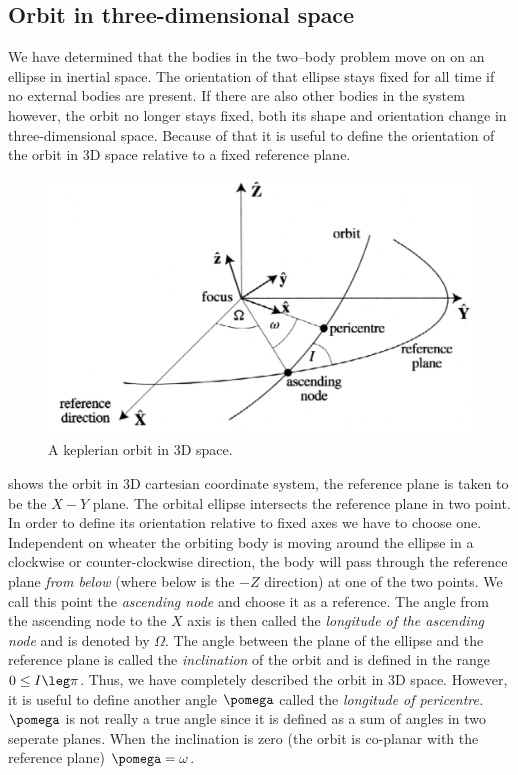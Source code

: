 \subsection{Orbit in three-dimensional space}
We have determined that the bodies in the two--body problem move on
on an ellipse in inertial space. The orientation of that ellipse 
stays fixed for all time if no external bodies are present. If there 
are also other bodies in the system however, the orbit no longer stays
fixed, both its shape and orientation change in three-dimensional space.
Because of that it is useful to define the orientation of the orbit
in 3D space relative to a fixed reference plane.
\begin{figure}[htb]
\centering
\includegraphics[width=0.8\linewidth]{gfx/3d_orbit.png}
\caption{A keplerian orbit in 3D space.}
\label{fig:3d_orbit}
\end{figure}
 shows the orbit in 3D cartesian coordinate system,
the reference plane is taken to be the $X-Y$ plane. The orbital
ellipse intersects the reference plane in two point. In order to define
its orientation relative to fixed axes we have to choose one. Independent
on wheater the orbiting body is moving around the ellipse in a clockwise
or counter-clockwise direction, the body will pass through the reference
plane \emph{from below} (where below is the $-Z$ direction)
at one of the two points. We call this point the \emph{ascending node}
and choose it as a reference. The angle from the ascending node to the
$X$ axis is then called the \emph{longitude of the ascending node} and
is denoted by $\Omega$. The angle between the plane of the ellipse and
the reference plane is called the \emph{inclination} of the orbit and
is defined in the range $0\leq I\leg \pi$.
Thus, we have completely described the orbit in 3D space. However, it is useful to 
define another angle $\pomega$ called the \emph{longitude of pericentre.} 
$\pomega$ is not really a true angle since it is defined as a sum of 
angles in two seperate planes. When the inclination is zero (the orbit
is co-planar with the reference plane) $\pomega=\omega$. 

